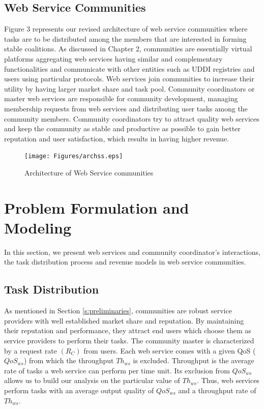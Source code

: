 \subsection{Web Service Communities}\label{webservice-communities}

Figure 3 represents our revised architecture of web service
communities where tasks are to be distributed among the members
that are interested in forming stable coalitions. As discussed in
Chapter 2, communities are essentially virtual platforms
aggregating web services having similar and complementary
functionalities and communicate with other entities such as UDDI
registries and users using particular protocols. Web services join
communities to increase their utility by having larger market
share and task pool. Community coordinators or master web services
are responsible for community development, managing membership
requests from web services and distributing user tasks among the
community members. Community coordinators try to attract quality
web services and keep the community as stable and productive as
possible to gain better reputation and user satisfaction, which
results in having higher revenue.

\begin{figure}[!t]
\centerline{\texttt{[image: Figures/archss.eps]}}
\caption{Architecture of Web Service communities}
\label{fig_community}
\end{figure}


\section{Problem Formulation and Modeling}\label{s:model}

In this section, we present  web services and community coordinator's interactions, the task distribution process and revenue models in web service communities.

\subsection{Task Distribution}

As mentioned in Section \ref{s:preliminaries}, communities
are robust service providers with well established market share
and reputation. By maintaining their reputation and performance,
they attract  end users which choose them as service providers to
perform their tasks. The community master is characterized by a
request rate $(R_C)$ from users. Each web service comes with a
given QoS ($QoS_{ws}$) from which the throughput $Th_{ws}$ is
excluded. Throughput is the average rate of tasks a web service
can perform per time unit. Its exclusion from $QoS_{ws}$ allows us
to build our analysis on the particular value of $Th_{ws}$. Thus,
web services perform tasks with an average output quality of
$QoS_{ws}$ and a throughput rate of $Th_{ws}$.

